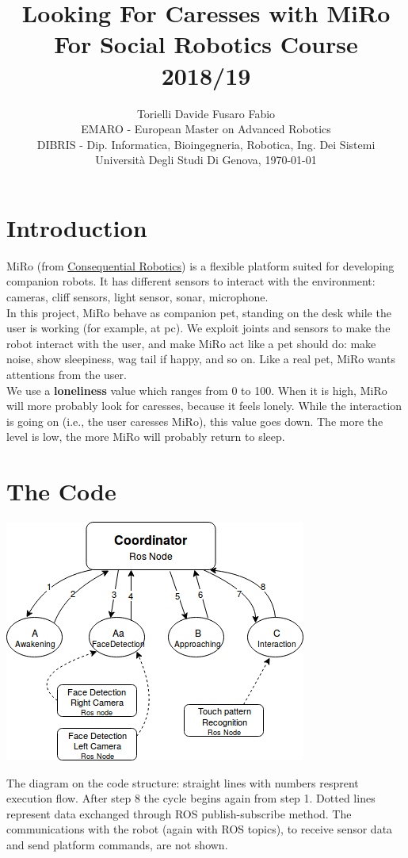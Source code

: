 \documentclass[12pt,peerreviewca, a4paper, onecolumn]{article}
\title{\LARGE\textbf{Looking For Caresses with MiRo}\\\large For Social Robotics Course 2018/19}
\author{\large{Torielli Davide \quad Fusaro Fabio} \\
	\small EMARO - European Master on Advanced Robotics\\
	\small DIBRIS - Dip. Informatica, Bioingegneria, Robotica, Ing. Dei Sistemi\\
	\small Universit\`{a} Degli Studi Di Genova, \today}
\begin{document}
	\maketitle
	
	\section{Introduction}
	MiRo (from \href{http://consequentialrobotics.com/}{Consequential Robotics}) is a flexible platform suited for developing companion robots. It has different sensors to interact with the environment: cameras, cliff sensors, light sensor, sonar, microphone.\\
	In this project, MiRo behave as companion pet, standing on the desk while the user is working (for example, at pc). We exploit joints and sensors to make the robot interact with the user, and make MiRo act like a pet should do: make noise, show sleepiness, wag tail if happy, and so on. Like a real pet, MiRo wants attentions from the user.\\ 
	We use a \textbf{loneliness} value which ranges from 0 to 100. When it is high, MiRo will more probably look for caresses, because it feels lonely. While the interaction is going on (i.e., the user caresses  MiRo), this value goes down. The more the level is low, the more MiRo will probably return to sleep.
	
	\section{The Code}
	\begin{center}
		\includegraphics[scale=0.5]{diagram}
	\end{center}
	{\small The diagram on the code structure: straight lines with numbers resprent execution flow. After step 8 the cycle begins again from step 1. Dotted lines represent data exchanged through ROS publish-subscribe method. The communications with the robot (again with ROS topics), to receive sensor data and send platform commands, are not shown.}\\
\end{document}
